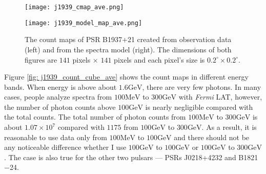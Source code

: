 \documentclass[a4paper, 12pt]{report}
\begin{document}
        \begin{figure}[!ht]
          \begin{center}
          \begin{minipage}{0.45\textwidth}
            \begin{center} 
              \texttt{[image: j1939\_cmap\_ave.png]}
            \end{center}
          \end{minipage}
          \begin{minipage}{0.45\textwidth}
            \begin{center}
              \texttt{[image: j1939\_model\_map\_ave.png]}
            \end{center}
          \end{minipage}
        \end{center}
        \caption[The count maps of PSR B1937+21 created from observation 
            data (left) and from the spectra model (right).]
            {The count maps of PSR B1937+21 created from observation 
            data (left) and from the spectra model (right). The dimensions
            of both figures are $141$ pixels $\times$ $141$ pixels and each pixel's size is
            $0.2^{\circ}\times0.2^{\circ}$.}
          \label{fig: j1939_count_map_ave}
        \end{figure}

        Figure \ref{fig: j1939_count_cube_ave} shows the count maps in different energy 
        bands. When energy is above about $1.6\mbox{GeV}$, there are very few photons. In 
        many cases, people analyze spectra from $100\mbox{MeV}$ to $300\mbox{GeV}$ with 
        \textit{Fermi} LAT, however, the number of photon counts above $100\mbox{GeV}$ is 
        nearly negligible compared with the total counts. The total number of photon counts 
        from $100\mbox{MeV}$ to $300\mbox{GeV}$ is about $1.07\times10^7$ compared with 
        $1175$ from $100\mbox{GeV}$ to $300\mbox{GeV}$. As a result, it is reasonable to 
        use data only from $100\mbox{MeV}$ to $100\mbox{GeV}$ and there should not be any 
        noticeable difference whether I use $100\mbox{GeV}$ to $100\mbox{GeV}$ or 
        $100\mbox{GeV}$ to $300\mbox{GeV}$. The case is also true for 
        the other two pulsars --- PSRs J0218+4232 and B1821$-$24. 
\end{document}

